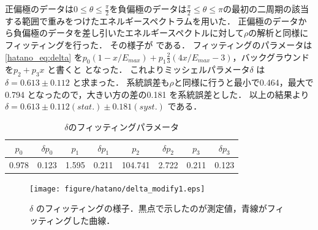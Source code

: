 正偏極のデータは$0\leq\theta\leq\frac{\pi}{2}$を負偏極のデータは$\frac{\pi}{2}\leq\theta\leq\pi$の最初の二周期の該当する範囲で重みをつけたエネルギースペクトラムを用いた．
正偏極のデータから負偏極のデータを差し引いたエネルギースペクトルに対して$\rho$の解析と同様にフィッティングを行った．
その様子が である．
フィッティングのパラメータは\eqref{hatano_eq:delta} を$p_0(1-x/E_{max})+p_1\frac{2}{3}(4x/E_{max}-3)$，バックグラウンドを$p_2+p_3x$ と書くと となった．
これよりミッシェルパラメータ$\delta$ は$\delta=0.613\pm0.112$ と求まった．
系統誤差も$\rho$と同様に行うと最小で0.464，最大で0.794 となったので，大きい方の差の0.181 を系統誤差とした．
以上の結果より$\delta=0.613\pm0.112 (stat.) \pm0.181 (syst.)$ である．

\begin{table}[hbt]
\centering
\caption{$\delta$のフィッティングパラメータ}
\begin{tabular}{cccccccc}
$p_0$ & $\delta p_0$ & $p_1$ & $\delta p_1$ & $p_2$ & $\delta p_2$ & $p_3$ & $\delta p_3$ \\ \hline
0.978 & 0.123 & 1.595 & 0.211 & 104.741 & 2.722 & 0.211 & 0.123 \\
\end{tabular}
\label{hatano_tab:delta}
\end{table}

\begin{figure}[hbt]
\centering
\texttt{[image: figure/hatano/delta\_modify1.eps]}
\caption{$\delta$ のフィッティングの様子．黒点で示したのが測定値，青線がフィッティングした曲線．}
\label{hatano_fig:delta}
\end{figure}

%

